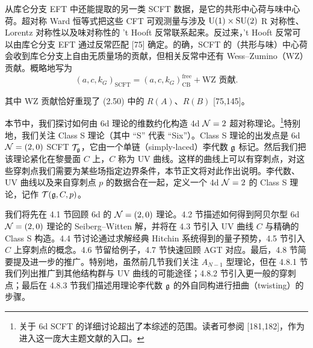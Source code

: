 从库仑分支 EFT 中还能提取的另一类 SCFT 数据，是它的共形中心荷与味中心荷。超对称 Ward 恒等式把这些 CFT 可观测量与涉及 $\mathrm{U}(1)\times\mathrm{SU}(2)$ R 对称性、Lorentz 对称性以及味对称性的 't Hooft 反常联系起来。反过来，'t Hooft 反常可以由库仑分支 EFT 通过反常匹配 [75] 确定。的确，SCFT 的（共形与味）中心荷会收到库仑分支上自由无质量场的贡献，但相关反常中还有 Wess--Zumino（WZ）贡献。概略地写为
\begin{equation}
  (a,c,k_G)_{\mathrm{SCFT}} = (a,c,k_G)^{\mathrm{free}}_{\mathrm{CB}} + \text{WZ 贡献}.
  \tag{3.42}
\end{equation}


其中 WZ 贡献恰好重现了 (2.50) 中的 $R(A)$、$R(B)$ [75,145]。


本节中，我们探讨如何由 6d 理论的维数约化构造 4d $\mathcal{N}=2$ 超对称理论。\footnote{关于 6d SCFT 的详细讨论超出了本综述的范围。读者可参阅 [181,182]，作为进入这一庞大主题文献的入口。}特别地，我们关注 Class S 理论（其中 “S” 代表 “Six”）。Class S 理论的出发点是 6d $\mathcal{N}=(2,0)$ SCFT $\mathcal{T}_{\mathfrak{g}}$，它由一个单链（simply-laced）李代数 $\mathfrak{g}$ 标记。然后我们把该理论紧化在黎曼面 $C$ 上，$C$ 称为 UV 曲线。这样的曲线上可以有穿刺点，对这些穿刺点我们需要为某些场指定边界条件，本节正文将对此作出说明。李代数、UV 曲线以及来自穿刺点 $p$ 的数据合在一起，定义一个 4d $\mathcal{N}=2$ 的 Class S 理论，记作 $\mathcal{T}(\mathfrak{g},C,p)$。


我们将先在 4.1 节回顾 6d 的 $\mathcal{N}=(2,0)$ 理论。4.2 节描述如何得到阿贝尔型 6d $\mathcal{N}=(2,0)$ 理论的 Seiberg--Witten 解，并将在 4.3 节引入 UV 曲线 $C$ 与精确的 Class S 构造。4.4 节讨论通过求解经典 Hitchin 系统得到的量子预势，4.5 节引入 $C$ 上穿刺点的概念。4.6 节留给例子，4.7 节快速回顾 AGT 对应。最后，4.8 节简要提及进一步的推广。特别地，虽然前几节我们关注 $A_{N-1}$ 型理论，但在 4.8.1 节我们列出推广到其他结构群与 UV 曲线的可能途径；4.8.2 节引入更一般的穿刺点；最后在 4.8.3 节我们描述用理论李代数 $\mathfrak{g}$ 的外自同构进行扭曲（twisting）的步骤。

